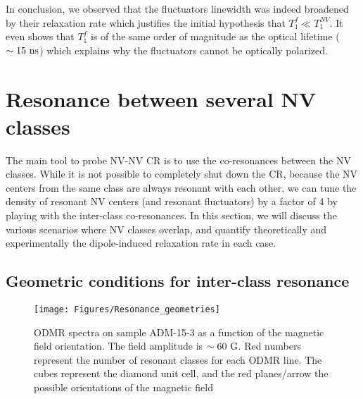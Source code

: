 \documentclass[a4paper,11pt]{report}
\begin{document}
In conclusion, we observed that the fluctuators linewidth was indeed broadened by their relaxation rate which justifies the initial hypothesis that $T_1^f \ll T_1^{NV}$. It even shows that $T_1^f$ is of the same order of magnitude as the optical lifetime ($\sim 15\ \rm ns$) which explains why the fluctuators cannot be optically polarized.

\section{Resonance between several NV classes}

The main tool to probe NV-NV CR is to use the co-resonances between the NV classes. While it is not possible to completely shut down the CR, because the NV centers from the same class are always resonant with each other, we can tune the density of resonant NV centers (and resonant fluctuators) by a factor of 4 by playing with the inter-class co-resonances. In this section, we will discuss the various scenarios where NV classes overlap, and quantify theoretically and experimentally the dipole-induced relaxation rate in each case.

\subsection{Geometric conditions for inter-class resonance}

\begin{figure}[h!]
\centering
\texttt{[image: Figures/Resonance\_geometries]}
\caption{ODMR spectra on sample ADM-15-3 as a function of the magnetic field orientation. The field amplitude is $\sim 60\ \rm G$. Red numbers represent the number of resonant classes for each ODMR line. The cubes represent the diamond unit cell, and the red planes/arrow the possible orientations of the magnetic field}
\label{ODMR_geometries}
\end{figure}
\end{document}
